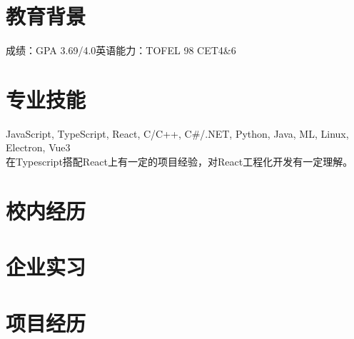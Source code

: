 \documentclass{uniquecv}
\begin{document}

\medskip




\section{教育背景}
成绩：GPA 3.69/4.0\quad 英语能力：TOFEL 98 \quad CET4\&6



\section{专业技能}
\smallskip
JavaScript, TypeScript, React, C/C++, C\#/.NET, Python, Java, ML, Linux, Electron, Vue3
\\
在Typescript搭配React上有一定的项目经验，对React工程化开发有一定理解。



\section{校内经历}
\smallskip


\section{企业实习}
\smallskip




\section{项目经历}
\end{document}

